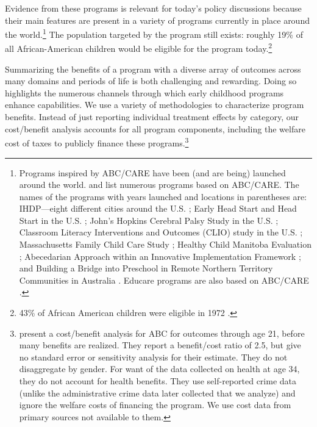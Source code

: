 Evidence from these programs is relevant for today's policy discussions because their main features are present in a variety of programs currently in place around the world.\footnote{Programs inspired by ABC/CARE have been (and are being) launched around the world. \citet{Sparling_2010_Highlights} and \citet{Ramey_Ramey_Lanzi_2014_Interventions} list numerous programs based on ABC/CARE. The names of the programs with years launched and locations in parentheses are: IHDP---eight different cities around the U.S. \citep{Spiker-etal_1997_Helping}; Early Head Start and Head Start in the U.S. \citep{Schneider_McDonald-eds_2007_Scale-Up_Vol-1}; John's Hopkins Cerebral Palsy Study in the U.S. \citep{Sparling_2010_Highlights}; Classroom Literacy Interventions and Outcomes (CLIO) study in the U.S. \citep{Sparling_2010_Highlights}; Massachusetts Family Child Care Study \citep{Collins_etal_2010_Massachusetts-Study}; Healthy Child Manitoba Evaluation \citep{Healthy_Child_Manitoba_2015_Starting-Early}; Abecedarian Approach within an Innovative Implementation Framework \citep{Jensen_Nielsen_2016_ABC-Programme-Pilot}; and Building a Bridge into Preschool in Remote Northern Territory Communities in Australia \citep{UMonash_Dataset_2015_URL}. Educare programs are also based on ABC/CARE \citep{Educare_2014_Research_Agenda,Yazejian_Bryant_2012_Educare}.} The population targeted by the program still exists: roughly 19\% of all African-American children would be eligible for the program today.\footnote{43\% of African American children were eligible in 1972 \citep{Garcia_2016_National-Implementation-ECI}.}

Summarizing the benefits of a program with a diverse array of outcomes across many domains and periods of life is both challenging and rewarding. Doing so highlights the numerous channels through which early childhood programs enhance capabilities. We use a variety of methodologies to characterize program benefits. Instead of just reporting individual treatment effects by category, our cost/benefit analysis accounts for all program components, including the welfare cost of taxes to publicly finance these programs.\footnote{\cite{Barnett_Masse_2002_benefitcost,Barnett_Masse_2007_EER} present a cost/benefit analysis for ABC for outcomes through age 21, before many benefits are realized. They report a benefit/cost ratio of 2.5, but give no standard error or sensitivity analysis for their estimate. They do not disaggregate by gender. For want of the data collected on health at age 34, they do not account for health benefits. They use self-reported crime data (unlike the administrative crime data later collected that we analyze) and ignore the welfare costs of financing the program. We use cost data from primary sources not available to them.}

